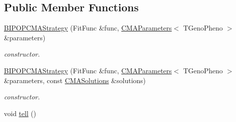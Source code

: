 \subsection*{Public Member Functions}
\begin{DoxyCompactItemize}
\item 
\hyperlink{classlibcmaes_1_1BIPOPCMAStrategy_a4c693467ab661f639e2fe2120dabcc6e}{B\-I\-P\-O\-P\-C\-M\-A\-Strategy} (Fit\-Func \&func, \hyperlink{classlibcmaes_1_1CMAParameters}{C\-M\-A\-Parameters}$<$ T\-Geno\-Pheno $>$ \&parameters)
\begin{DoxyCompactList}\small\item\em constructor. \end{DoxyCompactList}\item 
\hyperlink{classlibcmaes_1_1BIPOPCMAStrategy_a33ea94936c2a70c54d4b2e48f04f803f}{B\-I\-P\-O\-P\-C\-M\-A\-Strategy} (Fit\-Func \&func, \hyperlink{classlibcmaes_1_1CMAParameters}{C\-M\-A\-Parameters}$<$ T\-Geno\-Pheno $>$ \&parameters, const \hyperlink{classlibcmaes_1_1CMASolutions}{C\-M\-A\-Solutions} \&solutions)
\begin{DoxyCompactList}\small\item\em constructor. \end{DoxyCompactList}\item 
\hypertarget{classlibcmaes_1_1BIPOPCMAStrategy_adc3f5ef544a151efeb96e4d4c83e1858}{void \hyperlink{classlibcmaes_1_1BIPOPCMAStrategy_adc3f5ef544a151efeb96e4d4c83e1858}{tell} ()}\label{classlibcmaes_1_1BIPOPCMAStrategy_adc3f5ef544a151efeb96e4d4c83e1858}


\end{DoxyCompactItemize}
